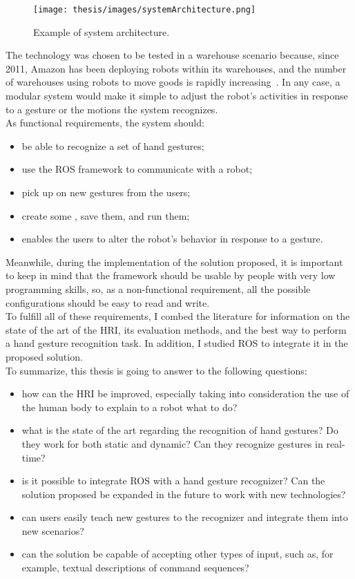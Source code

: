 \documentclass[../thesis.tex]{subfiles}
\begin{document}
\begin{figure}
  \centering
  \texttt{[image: thesis/images/systemArchitecture.png]}
  \caption{Example of system architecture.}
  \label{fig:systemArchitecture}
\end{figure}

The technology was chosen to be tested in a warehouse scenario because, since 2011, Amazon has been deploying robots within its warehouses, and the number of warehouses using robots to move goods is rapidly increasing~\cite{paper:bogue2016}. In any case, a modular system would make it simple to adjust the robot's activities in response to a gesture or the motions the system recognizes.\\

As functional requirements, the system should:
\begin{itemize}
    \item be able to recognize a set of hand gestures;
    \item use the \gls{ROS} framework to communicate with a robot;
    \item pick up on new gestures from the users;
    \item create some , save them, and run them;
    \item enables the users to alter the robot's behavior in response to a gesture.
\end{itemize}
Meanwhile, during the implementation of the solution proposed, it is important to keep in mind that the framework should be usable by people with very low programming skills, so, as a non-functional requirement, all the possible configurations should be easy to read and write.\\

To fulfill all of these requirements, I combed the literature for information on the state of the art of the \acrshort{HRI}, its evaluation methods, and the best way to perform a hand gesture recognition task. In addition, I studied \gls{ROS} to integrate it in the proposed solution.\\

To summarize, this thesis is going to answer to the following questions:
\begin{itemize}
    \item how can the \acrlong{HRI} be improved, especially taking into consideration the use of the human body to explain to a robot what to do?
    \item what is the state of the art regarding the recognition of hand gestures? Do they work for both static and dynamic? Can they recognize gestures in real-time?
    \item is it possible to integrate \gls{ROS} with a hand gesture recognizer? Can the solution proposed be expanded in the future to work with new technologies?
    \item can users easily teach new gestures to the recognizer and integrate them into new scenarios?
    \item can the solution be capable of accepting other types of input, such as, for example, textual descriptions of command sequences?
\end{itemize}
\end{document}
